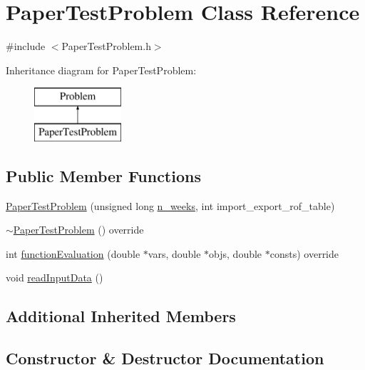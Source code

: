 \hypertarget{classPaperTestProblem}{}\section{Paper\+Test\+Problem Class Reference}
\label{classPaperTestProblem}


{\ttfamily \#include $<$Paper\+Test\+Problem.\+h$>$}

Inheritance diagram for Paper\+Test\+Problem\+:\begin{figure}[H]
\begin{center}
\leavevmode
\includegraphics[height=2.000000cm]{classPaperTestProblem}
\end{center}
\end{figure}
\subsection*{Public Member Functions}
\begin{DoxyCompactItemize}
\item 
\mbox{\hyperlink{classPaperTestProblem_acc053a5b4515f3959494ce58c763d582}{Paper\+Test\+Problem}} (unsigned long \mbox{\hyperlink{classProblem_ac7513bb0ecdfa4bbb7d2ada3595d71ec}{n\+\_\+weeks}}, int import\+\_\+export\+\_\+rof\+\_\+table)
\item 
\mbox{\hyperlink{classPaperTestProblem_a571a92266d4c58ebc27e20391f7ad81b}{$\sim$\+Paper\+Test\+Problem}} () override
\item 
int \mbox{\hyperlink{classPaperTestProblem_a6db78df74d40f69a750b164caaca75c7}{function\+Evaluation}} (double $\ast$vars, double $\ast$objs, double $\ast$consts) override
\item 
void \mbox{\hyperlink{classPaperTestProblem_ae4bcc17d6ceab628f88174306d54fdc9}{read\+Input\+Data}} ()
\end{DoxyCompactItemize}
\subsection*{Additional Inherited Members}


\subsection{Constructor \& Destructor Documentation}
\mbox{\label{classPaperTestProblem_acc053a5b4515f3959494ce58c763d582}} 
